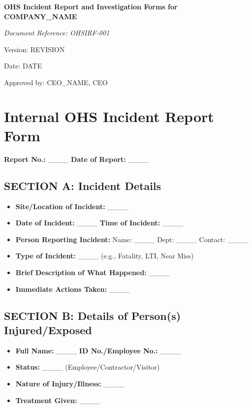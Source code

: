 \documentclass[12pt]{article}
\begin{document}
\begin{titlepage}
    \centering
    \vspace*{2cm}
    {\LARGE\bfseries OHS Incident Report and Investigation Forms for {{COMPANY_NAME}}\par}
    \vspace{1cm}
    {\large\itshape Document Reference: OHSIRF-001\par}
    \vspace{0.5cm}
    {\normalsize Version: {{REVISION}}\par}
    \vspace{0.5cm}
    {\normalsize Date: {{DATE}}\par}
    \vspace{2cm}
    {\normalsize Approved by: {{CEO_NAME}}, CEO\par}
\end{titlepage}

\section{Internal OHS Incident Report Form}

\textbf{Report No.:} \_\_\_\_ \textbf{Date of Report:} \_\_\_\_

\subsection{SECTION A: Incident Details}
\begin{itemize}
    \item \textbf{Site/Location of Incident:} \_\_\_\_
    \item \textbf{Date of Incident:} \_\_\_\_ \textbf{Time of Incident:} \_\_\_\_
    \item \textbf{Person Reporting Incident:} Name: \_\_\_\_ Dept: \_\_\_\_ Contact: \_\_\_\_
    \item \textbf{Type of Incident:} \_\_\_\_ (e.g., Fatality, LTI, Near Miss)
    \item \textbf{Brief Description of What Happened:} \_\_\_\_
    \item \textbf{Immediate Actions Taken:} \_\_\_\_
\end{itemize}

\subsection{SECTION B: Details of Person(s) Injured/Exposed}
\begin{itemize}
    \item \textbf{Full Name:} \_\_\_\_ \textbf{ID No./Employee No.:} \_\_\_\_
    \item \textbf{Status:} \_\_\_\_ (Employee/Contractor/Visitor)
    \item \textbf{Nature of Injury/Illness:} \_\_\_\_
    \item \textbf{Treatment Given:} \_\_\_\_
\end{itemize}
\end{document}
